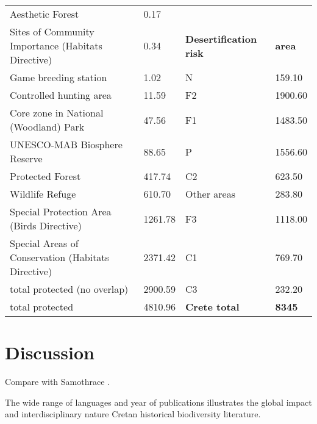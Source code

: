 \begin{longtable}{llll}
Aesthetic Forest                                   & 0.17          &                                            &                  \\
Sites of Community Importance (Habitats Directive) & 0.34          & \textbf{Desertification risk}              & \textbf{area}    \\
Game breeding station                              & 1.02          & N                                          & 159.10           \\
Controlled hunting area                            & 11.59         & F2                                         & 1900.60          \\
Core zone in National (Woodland) Park              & 47.56         & F1                                         & 1483.50          \\
UNESCO-MAB Biosphere Reserve                       & 88.65         & P                                          & 1556.60          \\
Protected Forest                                   & 417.74        & C2                                         & 623.50           \\
Wildlife Refuge                                    & 610.70        & Other areas                                & 283.80           \\
Special Protection Area (Birds Directive)          & 1261.78       & F3                                         & 1118.00          \\
Special Areas of Conservation (Habitats Directive) & 2371.42       & C1                                         & 769.70           \\
total protected (no overlap)                       & 2900.59       & C3                                         & 232.20           \\
total protected                                    & 4810.96       & \textbf{Crete total}                       & \textbf{8345}
\end{longtable}


\section{Discussion}\label{crete_idea_discussion}

Compare with Samothrace \parencite{noll2024insights}.

The wide range of languages and year of publications illustrates the global impact and interdisciplinary nature Cretan historical biodiversity literature.

